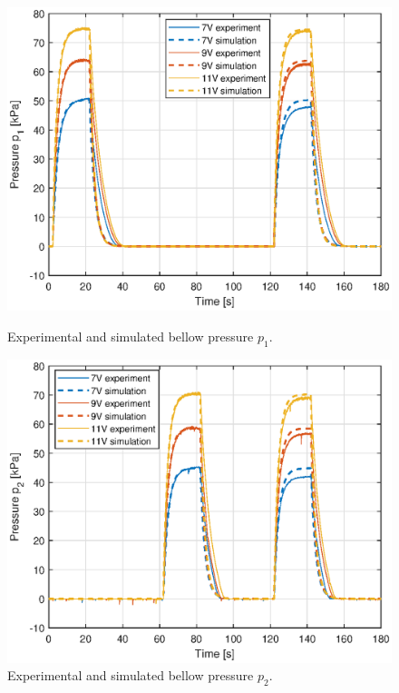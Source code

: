 \begin{figure}[H] 
    \begin{minipage}[b]{0.49\linewidth}
     \centering
    \includegraphics[width=\linewidth]{Figures/Chapter5/paramp1.eps} 
    \caption{Experimental and simulated bellow pressure $p_1$. } 
    \label{fig5:p1} 
       \end{minipage} 
    \begin{minipage}[b]{0.49\linewidth}
     \centering
    \includegraphics[width=\linewidth]{Figures/Chapter5/paramp2.eps} 
    \caption{Experimental and simulated bellow pressure $p_2$. } 
    \label{fig5:p2} 
    \end{minipage} 
\end{figure}




